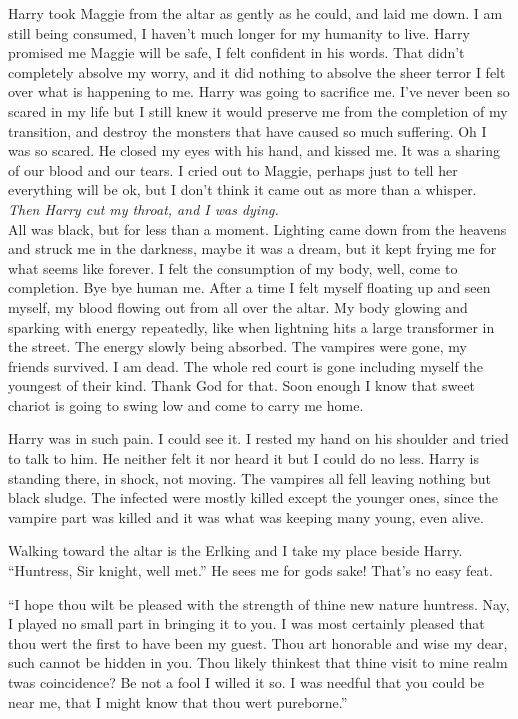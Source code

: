Harry took Maggie from the altar as gently as he could, and laid me down. I am still being consumed, I haven't much longer for my humanity to live. Harry promised me Maggie will be safe, I felt confident in his words. That didn't completely absolve my worry, and it did nothing to absolve the sheer terror I felt over what is happening to me. Harry was going to sacrifice me. I've never been so scared in my life but I still knew it would preserve me from the completion of my transition, and destroy the monsters that have caused so much suffering. Oh I was so scared. He closed my eyes with his hand, and kissed me. It was a sharing of our blood and our tears. I cried out to Maggie, perhaps just to tell her everything will be ok, but I don't think it came out as more than a whisper.\\

\textit{Then Harry cut my throat, and I was dying.}\\

All was black, but for less than a moment. Lighting came down from the heavens and struck me in the darkness, maybe it was a dream, but it kept frying me for what seems like forever. I felt the consumption of my body, well, come to completion. Bye bye human me. After a time I felt myself floating up and seen myself, my blood flowing out from all over the altar. My body glowing and sparking with energy repeatedly, like when lightning hits a large transformer in the street. The energy slowly being absorbed. The vampires were gone, my friends survived. I am dead. The whole red court is gone including myself the youngest of their kind. Thank God for that. Soon enough I know that sweet chariot is going to swing low and come to carry me home.

Harry was in such pain. I could see it. I rested my hand on his shoulder and tried to talk to him. He neither felt it nor heard it but I could do no less. Harry is standing there, in shock, not moving. The vampires all fell leaving nothing but black sludge. The infected were mostly killed except the younger ones, since the vampire part was killed and it was what was keeping many young, even alive. 

Walking toward the altar is the Erlking and I take my place beside Harry.\\

	``Huntress, Sir knight, well met.'' He sees me for gods sake! That's no easy feat.
	
	``I hope thou wilt be pleased with the strength of thine new nature huntress. Nay, I played no small part in bringing it to you. I was most certainly pleased that thou wert the first to have been my guest. Thou art honorable and wise my dear, such cannot be hidden in you. Thou likely thinkest that thine visit to mine realm twas coincidence? Be not a fool I willed it so. I was needful that you could be near me, that I might know that thou wert pureborne.''
	
